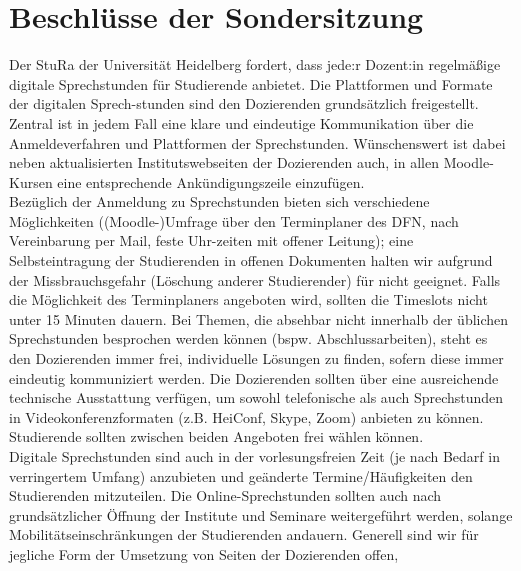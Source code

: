 \section{Beschlüsse der Sondersitzung}
    {
        Der StuRa der Universität Heidelberg fordert, dass jede:r Dozent:in regelmäßige
        digitale
        Sprechstunden für Studierende anbietet. Die Plattformen und Formate der digitalen
        Sprech-stunden sind den Dozierenden grundsätzlich freigestellt. Zentral ist in jedem
        Fall
        eine klare und eindeutige Kommunikation über die Anmeldeverfahren und Plattformen
        der Sprechstunden. Wünschenswert ist dabei neben aktualisierten Institutswebseiten
        der
        Dozierenden auch, in allen Moodle-Kursen eine entsprechende Ankündigungszeile
        einzufügen.\\
        Bezüglich der Anmeldung zu Sprechstunden bieten sich verschiedene Möglichkeiten
        ((Moodle-)Umfrage über den Terminplaner des DFN, nach Vereinbarung per Mail, feste
        Uhr-zeiten mit offener Leitung); eine Selbsteintragung der Studierenden in offenen
        Dokumenten halten wir aufgrund der Missbrauchsgefahr (Löschung anderer
        Studierender) für nicht geeignet. Falls die Möglichkeit des Terminplaners angeboten
        wird, sollten die Timeslots nicht unter 15 Minuten dauern. Bei Themen, die absehbar
        nicht innerhalb der üblichen Sprechstunden besprochen werden können (bspw.
        Abschlussarbeiten), steht es den Dozierenden immer frei, individuelle Lösungen zu
        finden, sofern diese immer eindeutig kommuniziert werden.
        Die Dozierenden sollten über eine ausreichende technische Ausstattung verfügen, um
        sowohl telefonische als auch Sprechstunden in Videokonferenzformaten (z.B. HeiConf,
        Skype, Zoom) anbieten zu können. Studierende sollten zwischen beiden Angeboten frei
        wählen können.\\
        Digitale Sprechstunden sind auch in der vorlesungsfreien Zeit (je nach Bedarf in
        verringertem Umfang) anzubieten und geänderte Termine/Häufigkeiten den
        Studierenden mitzuteilen. Die Online-Sprechstunden sollten auch nach grundsätzlicher
        Öffnung der Institute und Seminare weitergeführt werden, solange
        Mobilitätseinschränkungen der Studierenden andauern.
        Generell sind wir für jegliche Form der Umsetzung von Seiten der Dozierenden offen,
}
